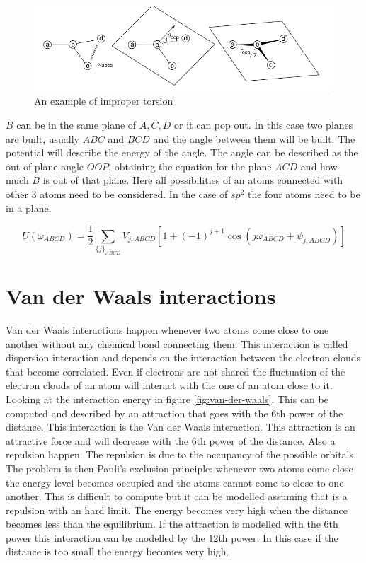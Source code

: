 	\begin{figure}[H]
		\includegraphics[width=\textwidth]{improper-torsions}
		\caption{An example of improper torsion}
		\label{fig:improper-torsions}
	\end{figure}

	$B$ can be in the same plane of $A, C, D$ or it can pop out.
	In this case two planes are built, usually $ABC$ and $BCD$ and the angle between them will be built.
	The potential will describe the energy of the angle.
	The angle can be described as the out of plane angle $OOP$, obtaining the equation for the plane $ACD$ and how much $B$ is out of that plane.
	Here all possibilities of an atoms connected with other $3$ atoms need to be considered.
	In the case of $sp^2$ the four atoms need to be in a plane.

	$$U(\omega_{ABCD}) = \frac{1}{2}\sum\limits_{\{j\}_{ABCD}}V_{j,ABCD}[1+(-1)^{j+1}\cos(j\omega_{ABCD}+\psi_{j,ABCD})]$$

\section{Van der Waals interactions}
Van der Waals interactions happen whenever two atoms come close to one another without any chemical bond connecting them.
This interaction is called dispersion interaction and depends on the interaction between the electron clouds that become correlated.
Even if electrons are not shared the fluctuation of the electron clouds of an atom will interact with the one of an atom close to it.
Looking at the interaction energy in figure \ref{fig:van-der-waals}.
This can be computed and described by an attraction that goes with the $6$th power of the distance.
This interaction is the Van der Waals interaction.
This attraction is an attractive force and will decrease with the $6$th power of the distance.
Also a repulsion happen.
The repulsion is due to the occupancy of the possible orbitals.
The problem is then Pauli's exclusion principle: whenever two atoms come close the energy level becomes occupied and the atoms cannot come to close to one another.
This is difficult to compute but it can be modelled assuming that is a repulsion with an hard limit.
The energy becomes very high when the distance becomes less than the equilibrium.
If the attraction is modelled with the $6$th power this interaction can be modelled by the $12$th power.
In this case if the distance is too small the energy becomes very high.

